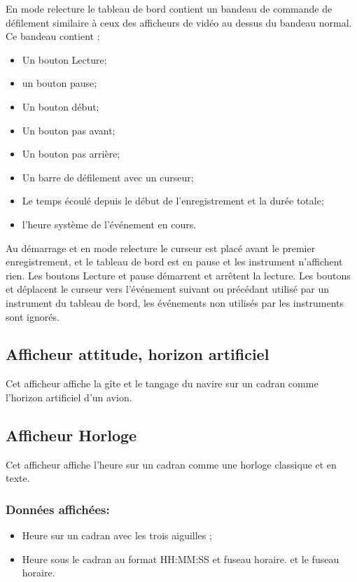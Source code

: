 \documentclass[a4paper,11pt]{report}
\begin{document}
En mode relecture le tableau de bord contient un bandeau de commande de défilement similaire à ceux des afficheurs de vidéo au dessus du bandeau normal.
Ce bandeau contient :
\begin{itemize}
    \item Un bouton Lecture;
    \item un bouton pause;
    \item Un bouton début;
    \item Un bouton pas avant;
    \item Un bouton pas arrière;
    \item Un barre de défilement avec un curseur;
    \item Le temps écoulé depuis le début de l'enregistrement et la durée totale;
    \item l'heure système de l'événement en cours.
\end{itemize}
Au démarrage et en mode relecture le curseur est placé avant le premier enregistrement, et le tableau de bord est en pause et
les instrument n'affichent rien.
Les boutons Lecture et pause démarrent et arrêtent la lecture.
Les boutons  et  déplacent le curseur
vers l'événement suivant ou précédant utilisé par un instrument du
tableau de bord, les événements non utilisés par les instruments sont ignorés.

\subsection{Afficheur attitude, horizon artificiel}
Cet afficheur affiche la gîte et le tangage du navire sur un cadran
comme l'horizon artificiel d'un avion.
\paragraph{}




\subsection{Afficheur Horloge}
Cet afficheur affiche l'heure sur un cadran comme une horloge classique
et en texte.
\paragraph{}



\subsubsection{Données affichées:}
\begin{itemize}
	\item Heure sur un cadran avec les trois aiguilles ;
	\item Heure  sous le cadran au format HH:MM:SS et fuseau horaire.
    et le fuseau horaire.
\end{itemize}
\end{document}
